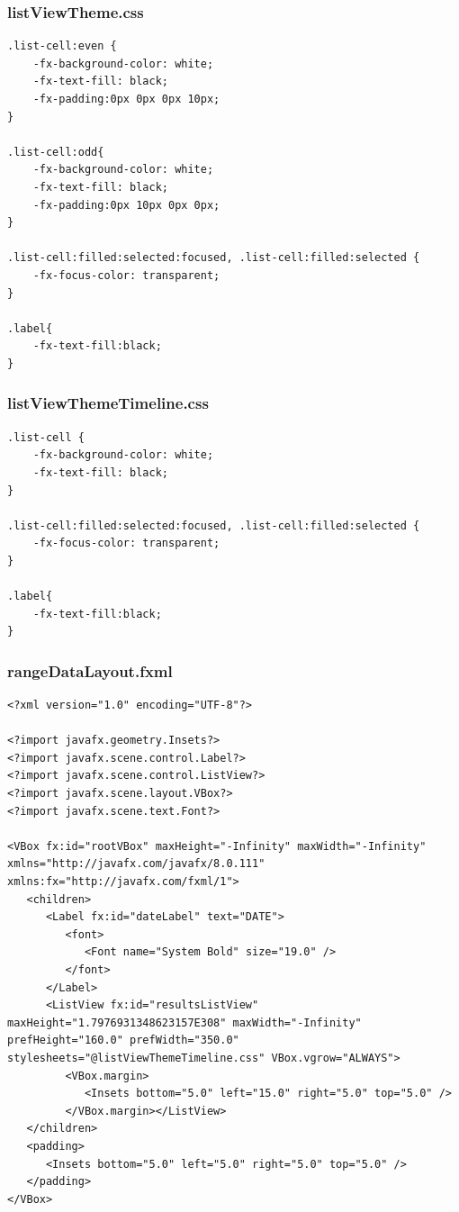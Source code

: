 \subsubsection{listViewTheme.css}
\begin{lstlisting}
.list-cell:even {
    -fx-background-color: white;
    -fx-text-fill: black;
    -fx-padding:0px 0px 0px 10px;
}

.list-cell:odd{
    -fx-background-color: white;
    -fx-text-fill: black;
    -fx-padding:0px 10px 0px 0px;
}

.list-cell:filled:selected:focused, .list-cell:filled:selected {
    -fx-focus-color: transparent;
}

.label{
    -fx-text-fill:black;
}
\end{lstlisting}
\subsubsection{listViewThemeTimeline.css}
\begin{lstlisting}
.list-cell {
    -fx-background-color: white;
    -fx-text-fill: black;
}

.list-cell:filled:selected:focused, .list-cell:filled:selected {
    -fx-focus-color: transparent;
}

.label{
    -fx-text-fill:black;
}
\end{lstlisting}
\subsubsection{rangeDataLayout.fxml}
\begin{lstlisting}
<?xml version="1.0" encoding="UTF-8"?>

<?import javafx.geometry.Insets?>
<?import javafx.scene.control.Label?>
<?import javafx.scene.control.ListView?>
<?import javafx.scene.layout.VBox?>
<?import javafx.scene.text.Font?>

<VBox fx:id="rootVBox" maxHeight="-Infinity" maxWidth="-Infinity" xmlns="http://javafx.com/javafx/8.0.111" xmlns:fx="http://javafx.com/fxml/1">
   <children>
      <Label fx:id="dateLabel" text="DATE">
         <font>
            <Font name="System Bold" size="19.0" />
         </font>
      </Label>
      <ListView fx:id="resultsListView" maxHeight="1.7976931348623157E308" maxWidth="-Infinity" prefHeight="160.0" prefWidth="350.0" stylesheets="@listViewThemeTimeline.css" VBox.vgrow="ALWAYS">
         <VBox.margin>
            <Insets bottom="5.0" left="15.0" right="5.0" top="5.0" />
         </VBox.margin></ListView>
   </children>
   <padding>
      <Insets bottom="5.0" left="5.0" right="5.0" top="5.0" />
   </padding>
</VBox>
\end{lstlisting}
